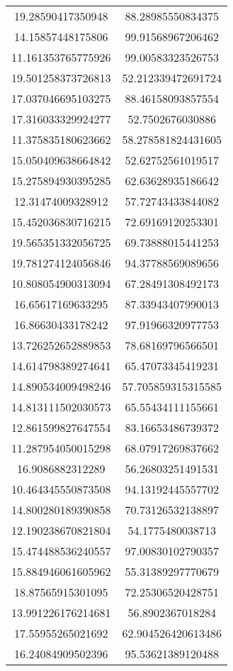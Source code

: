 \begin{table}
\begin{tabular}{cc}
19.28590417350948 & 88.28985550834375 \\
14.15857448175806 & 99.91568967206462 \\
11.161353765775926 & 99.00583323526753 \\
19.501258373726813 & 52.212339472691724 \\
17.037046695103275 & 88.46158093857554 \\
17.316033329924277 & 52.7502676030886 \\
11.375835180623662 & 58.278581824431605 \\
15.050409638664842 & 52.62752561019517 \\
15.275894930395285 & 62.63628935186642 \\
12.31474009328912 & 57.72743433844082 \\
15.452036830716215 & 72.69169120253301 \\
19.565351332056725 & 69.73888015441253 \\
19.781274124056846 & 94.37788569089656 \\
10.808054900313094 & 67.28491308492173 \\
16.65617169633295 & 87.33943407990013 \\
16.86630433178242 & 97.91966320977753 \\
13.726252652889853 & 78.68169796566501 \\
14.614798389274641 & 65.47073345419231 \\
14.890534009498246 & 57.705859315315585 \\
14.813111502030573 & 65.55434111155661 \\
12.861599827647554 & 83.16653486739372 \\
11.287954050015298 & 68.07917269837662 \\
16.9086882312289 & 56.26803251491531 \\
10.464345550873508 & 94.13192445557702 \\
14.800280189390858 & 70.73126532138897 \\
12.190238670821804 & 54.1775480038713 \\
15.474488536240557 & 97.00830102790357 \\
15.884946061605962 & 55.31389297770679 \\
18.87565915301095 & 72.25306520428751 \\
13.991226176214681 & 56.8902367018284 \\
17.55955265021692 & 62.904526420613486 \\
16.24084909502396 & 95.53621389120488 \\

\end{tabular}
\end{table}
